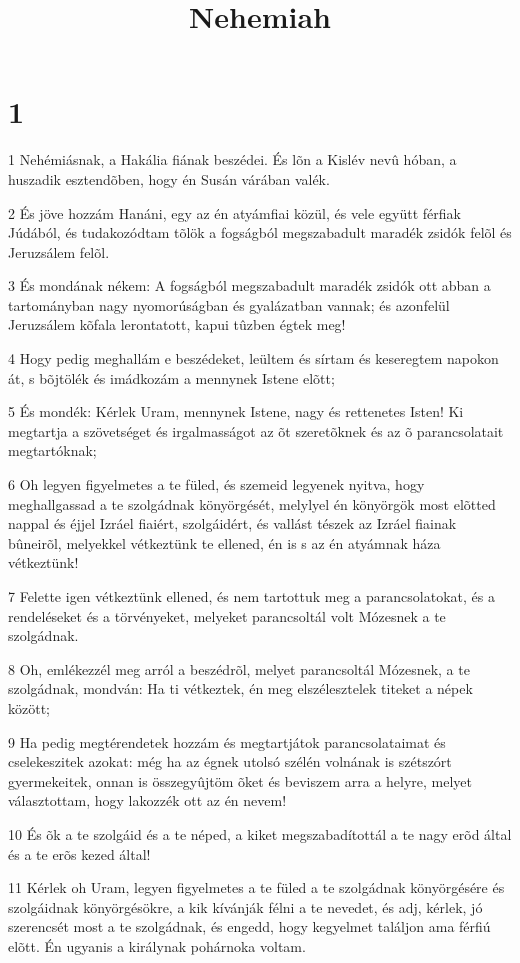 

\title{Nehemiah}


\chapter{1}

\par 1 Nehémiásnak, a Hakália fiának beszédei. És lõn a Kislév nevû hóban, a huszadik esztendõben, hogy én Susán várában valék.
\par 2 És jöve hozzám Hanáni, egy az én atyámfiai közül, és vele együtt férfiak Júdából, és tudakozódtam tõlök a fogságból megszabadult maradék zsidók felõl és Jeruzsálem felõl.
\par 3 És mondának nékem: A fogságból megszabadult maradék zsidók ott abban a tartományban nagy nyomorúságban és gyalázatban vannak; és azonfelül Jeruzsálem kõfala lerontatott, kapui tûzben égtek meg!
\par 4 Hogy pedig meghallám e beszédeket, leültem és sírtam és keseregtem napokon át, s bõjtölék és imádkozám a mennynek Istene elõtt;
\par 5 És mondék: Kérlek Uram, mennynek Istene, nagy és rettenetes Isten! Ki megtartja a szövetséget és irgalmasságot  az õt szeretõknek és az õ parancsolatait megtartóknak;
\par 6 Oh legyen figyelmetes a te füled, és szemeid legyenek nyitva, hogy meghallgassad a te szolgádnak könyörgését, melylyel én könyörgök most elõtted nappal és éjjel Izráel fiaiért, szolgáidért, és vallást tészek az Izráel fiainak bûneirõl, melyekkel vétkeztünk te ellened, én is s az én atyámnak háza vétkeztünk!
\par 7 Felette igen vétkeztünk ellened, és nem tartottuk meg a parancsolatokat, és a rendeléseket és a törvényeket, melyeket parancsoltál volt Mózesnek a te szolgádnak.
\par 8 Oh, emlékezzél meg arról a beszédrõl, melyet parancsoltál Mózesnek, a te szolgádnak, mondván: Ha ti vétkeztek, én meg elszélesztelek titeket a népek között;
\par 9 Ha pedig megtérendetek hozzám és megtartjátok parancsolataimat és cselekeszitek azokat: még ha az égnek utolsó szélén volnának is szétszórt gyermekeitek, onnan is összegyûjtöm õket és beviszem arra a helyre, melyet választottam, hogy lakozzék ott az én nevem!
\par 10 És õk a te szolgáid és a te néped, a kiket megszabadítottál a te nagy erõd által és a te erõs kezed által!
\par 11 Kérlek oh Uram, legyen figyelmetes a te füled a te szolgádnak könyörgésére és szolgáidnak könyörgésökre, a kik kívánják félni a te nevedet, és adj, kérlek, jó szerencsét most a te szolgádnak, és engedd, hogy kegyelmet találjon ama férfiú elõtt. Én ugyanis a királynak pohárnoka voltam.

